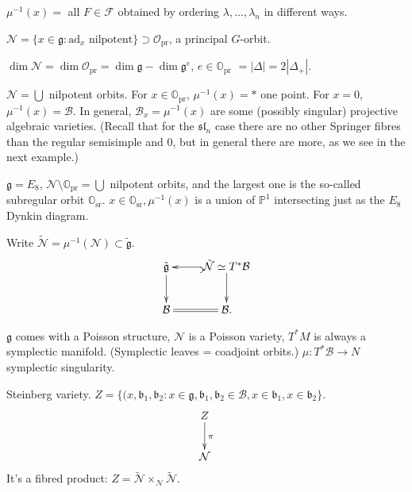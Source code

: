 $\mu^{-1}(x) = $ all $F \in \mathcal{F}$
obtained by ordering $\lambda,…,\lambda_n$
in different ways.

\medskip\noindent
$\mathcal{N}=\{x \in \mathfrak{g}:
\text{ad}_x \text{ nilpotent} \}
\supset \mathcal{O}_{\operatorname{pr}}$,
a principal $G$-orbit.

$\dim \mathcal{N} =
\dim\mathcal{O}_{\operatorname{pr}}
= \dim \mathfrak{g} -
\dim \mathfrak{g}^e$,
$e \in \mathbb{O}_{\operatorname{pr}}$
$= | \Delta|=
2 |\Delta_+|$.

$\mathcal{N}= \bigcup$ nilpotent orbits.
For $x \in \mathbb{O}_{\operatorname{pr}}$,
$\mu^{-1}(x) = *$ one point.
For $x=0$, $\mu^{-1}(x) = \mathcal{B}$.
In general, $\mathcal{B}_x=
\mu^{-1}(x)$ are some (possibly
singular) projective algebraic varieties.
(Recall that for the $\mathfrak{sl}_n$
case there are no other Springer
fibres than the regular semisimple
and 0, but in general there are more,
as we see in the next example.)

\begin{example}
\label{example-e8-springer-fibres}
$\mathfrak{g} = E_8$,
$\mathcal{N}\setminus
\mathbb{O}_{\operatorname{pr}}
= \bigcup$ nilpotent orbits,
and the largest one is
the so-called subregular
orbit $\mathbb{O}_{\operatorname{sr}}$.
$x \in \mathbb{O}_{\operatorname{sr}},
\mu^{-1}(x)$ is a union of $\mathbb{P}^1$
intersecting just as the $E_8$ 
Dynkin diagram.
\end{example}

\noindent
Write
$\widetilde{\mathcal{N}}=\mu^{-1}(\mathcal{N})
\subset \tilde{\mathfrak{g}}$.
$$
\xymatrix{
\tilde{\mathfrak{g}}\ar[d]
&  \tilde{\mathcal{N}}
\simeq T^*\mathcal{B}
\ar@{^{(}->}[l]\ar[d]\\
\mathcal{B}\ar@{=}[r]&  \mathcal{B}.
}
$$

\begin{remark}
\label{remark-symplectic}
$\mathfrak{g}$ comes with a Poisson structure,
$\mathcal{N}$ is a Poisson variety,
$T^*M$ is always a symplectic manifold.
(Symplectic leaves = coadjoint orbits.)
$\mu :T^*\mathcal{B} \to N$
symplectic singularity.
\end{remark}

\noindent
Steinberg variety.
$Z = \{(x,\mathfrak{b}_1,\mathfrak{b}_2:
x \in \mathfrak{g}, \mathfrak{b}_1,
\mathfrak{b}_2 \in \mathcal{B},
x \in \mathfrak{b}_1,
x \in \mathfrak{b}_2\}$.
$$
\xymatrix{
Z\ar[d]^\pi\\
\mathcal{N}
}
$$
It's a fibred product: $Z = 
\widetilde{\mathcal{N}}\times_\mathcal{N}
\widetilde{\mathcal{N}}$.


